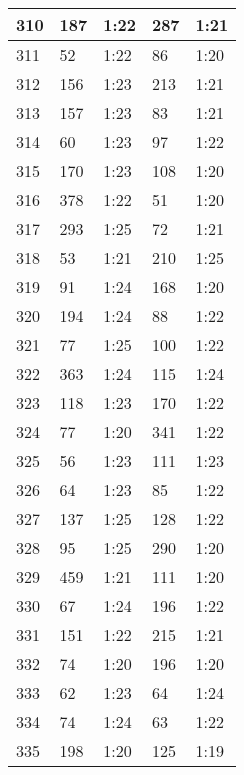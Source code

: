 \begin{center}
\begin{longtable}{|p{2cm}|l|l|l|l|}
310	&   187           &  1:22  &		287     	& 1:21 \\ \hline
311	&   52            &  1:22  &		86      	& 1:20 \\ \hline
312	&   156           &  1:23  &		213     	& 1:21 \\ \hline
313	&   157           &  1:23  &		83      	& 1:21 \\ \hline
314	&   60            &  1:23  &		97      	& 1:22 \\ \hline
315	&   170           &  1:23  &		108     	& 1:20 \\ \hline
316	&   378           &  1:22  &		51      	& 1:20 \\ \hline
317	&   293           &  1:25  &		72      	& 1:21 \\ \hline
318	&   53            &  1:21  &		210     	& 1:25 \\ \hline
319	&   91            &  1:24  &		168     	& 1:20 \\ \hline
320	&   194           &  1:24  &		88      	& 1:22 \\ \hline
321	&   77            &  1:25  &		100     	& 1:22 \\ \hline
322	&   363           &  1:24  &		115     	& 1:24 \\ \hline
323	&   118           &  1:23  &		170     	& 1:22 \\ \hline
324	&   77            &  1:20  &		341     	& 1:22 \\ \hline
325	&   56            &  1:23  &		111     	& 1:23 \\ \hline
326	&   64            &  1:23  &		85      	& 1:22 \\ \hline
327	&   137           &  1:25  &		128     	& 1:22 \\ \hline
328	&   95            &  1:25  &		290     	& 1:20 \\ \hline
329	&   459           &  1:21  &		111     	& 1:20 \\ \hline
330	&   67            &  1:24  &		196     	& 1:22 \\ \hline
331	&   151           &  1:22  &		215     	& 1:21 \\ \hline
332	&   74            &  1:20  &		196     	& 1:20 \\ \hline
333	&   62            &  1:23  &		64      	& 1:24 \\ \hline
334	&   74            &  1:24  &		63          & 1:22 \\ \hline
335	&   198           &  1:20  &		125     	& 1:19 \\ \hline

\end{longtable}
\end{center}
